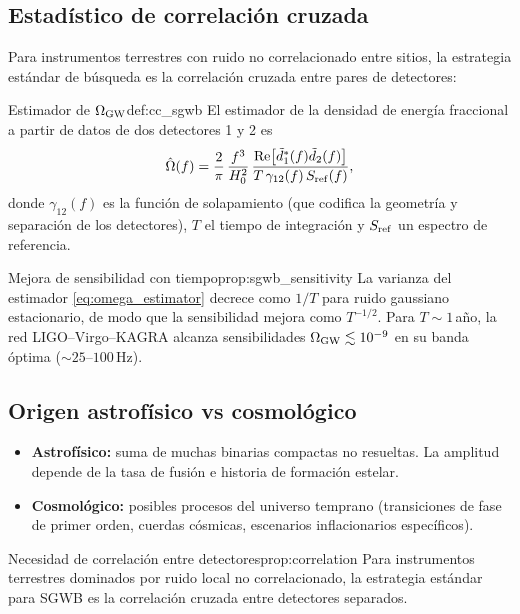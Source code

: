 \subsection{Estadístico de correlación cruzada}

Para instrumentos terrestres con ruido no correlacionado entre sitios, la estrategia estándar de búsqueda es la correlación cruzada entre pares de detectores:

\begin{definicion}{Estimador de $\Omega_{\rm GW}$}{def:cc_sgwb}
El estimador de la densidad de energía fraccional a partir de datos de dos detectores 1 y 2 es
\begin{equation}
  \hat\Omega(f) = \frac{2}{\pi}\,\frac{f^3}{H_0^2}\,
  \frac{\Re\bigl[\tilde{d}_1^*(f)\tilde{d}_2(f)\bigr]}{T\,\gamma_{12}(f)\,S_{\rm ref}(f)},
  \label{eq:omega_estimator}
\end{equation}
donde $\gamma_{12}(f)$ es la función de solapamiento (que codifica la geometría y separación de los detectores), $T$ el tiempo de integración y $S_{\rm ref}$ un espectro de referencia.
\end{definicion}

\begin{proposicion}{Mejora de sensibilidad con tiempo}{prop:sgwb_sensitivity}
La varianza del estimador \eqref{eq:omega_estimator} decrece como $1/T$ para ruido gaussiano estacionario, de modo que la sensibilidad mejora como $T^{-1/2}$. Para $T\sim 1$\,año, la red LIGO--Virgo--KAGRA alcanza sensibilidades $\Omega_{\rm GW} \lesssim 10^{-9}$ en su banda óptima ($\sim 25\text{--}100\,\mathrm{Hz}$).
\end{proposicion}

\subsection{Origen astrofísico vs cosmológico}

\begin{itemize}[leftmargin=2em]
  \item \textbf{Astrofísico:} suma de muchas binarias compactas no resueltas. La amplitud depende de la tasa de fusión e historia de formación estelar.
  \item \textbf{Cosmológico:} posibles procesos del universo temprano (transiciones de fase de primer orden, cuerdas cósmicas, escenarios inflacionarios específicos).
\end{itemize}

\begin{proposicion}{Necesidad de correlación entre detectores}{prop:correlation}
Para instrumentos terrestres dominados por ruido local no correlacionado, la estrategia estándar para SGWB es la correlación cruzada entre detectores separados.
\end{proposicion}

